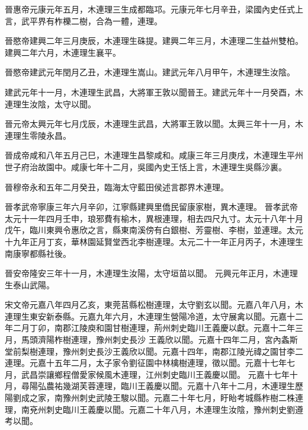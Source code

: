 \begin{pinyinscope}
 晉惠帝元康元年五月，木連理三生成都臨邛。元康元年七月辛丑，梁國內史任式上言，武平界有柞櫟二樹，合為一體，連理。



 晉愍帝建興二年三月庚辰，木連理生硃提。建興二年三月，木連理二生益州雙柏。
 建興二年六月，木連理生襄平。



 晉愍帝建武元年閏月乙丑，木連理生嵩山。建武元年八月甲午，木連理生汝陰。



 建武元年十一月，木連理生武昌，大將軍王敦以聞晉王。建武元年十一月癸酉，木連理生汝陰，太守以聞。



 晉元帝太興元年七月戊辰，木連理生武昌，大將軍王敦以聞。太興三年十一月，木連理生零陵永昌。



 晉成帝咸和八年五月己巳，木連理生昌黎咸和。咸康三年三月庚戌，木連理生平州世子府治故園中。咸康七年十二月，吳國內史王恬上言，木連理生吳縣沙裏。



 晉穆帝永和五年二月癸丑，臨海太守藍田侯述言郡界木連理。



 晉孝武帝寧康三年六月辛卯，江寧縣建興里僑民留康家樹，異木連理。
 晉孝武帝太元十一年四月壬申，琅邪費有榆木，異根連理，相去四尺九寸。太元十八年十月戊午，臨川東興令惠欣之言，縣東南溪傍有白銀樹、芳靈樹、李樹，並連理。太元十九年正月丁亥，華林園延賢堂西北李樹連理。太元二十一年正月丙子，木連理生南康寧都縣社後。



 晉安帝隆安三年十一月，木連理生汝陽，太守垣苗以聞。
 元興元年正月，木連理生泰山武陽。



 宋文帝元嘉八年四月乙亥，東莞莒縣松樹連理，太守劉玄以聞。元嘉八年八月，木連理生東安新泰縣。元嘉九年六月，木連理生營陽冷道，太守展禽以聞。元嘉十二年二月丁卯，南郡江陵庾和園甘樹連理，荊州刺史臨川王義慶以獻。元嘉十二年三月，馬頭濟陽柞樹連理，豫州刺史長沙
 王義欣以聞。元嘉十四年二月，宮內螽斯堂前梨樹連理，豫州刺史長沙王義欣以聞。元嘉十四年，南郡江陵光禕之園甘李二連理。元嘉十五年二月，太子家令劉征園中林檎樹連理，徵以聞。元嘉十七年七月，武昌崇讓鄉程僧愛家候風木連理，江州刺史臨川王義慶以聞。
 元嘉十七年十月，尋陽弘農祐幾湖芙蓉連理，臨川王義慶以聞。元嘉十八年十二月，木連理生歷陽劉成之家，南豫州刺史武陵王駿以聞。元嘉二十年七月，盱眙考城縣柞樹二株連理，南兗州刺史臨川王義慶以聞。元嘉二十年八月，木連理生汝陰，豫州刺史劉遵考以聞。




\end{pinyinscope}
